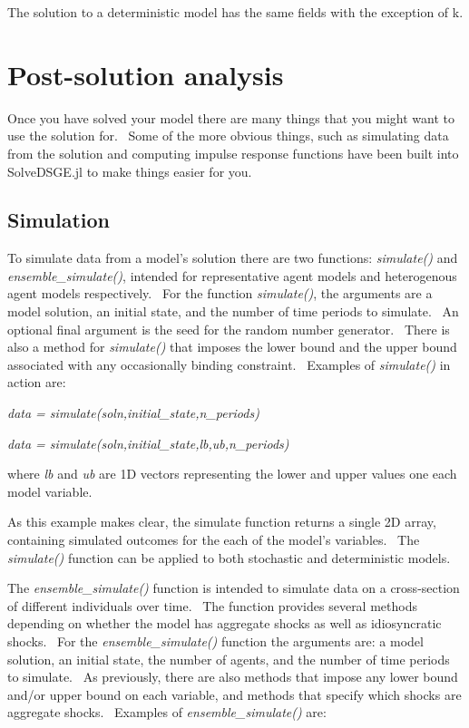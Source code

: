 \documentclass[notitlepage,11pt]{article}
\begin{document}
The solution to a deterministic model has the same fields with the exception
of k.

\section{Post-solution analysis}

Once you have solved your model there are many things that you might want to
use the solution for. \ Some of the more obvious things, such as simulating
data from the solution and computing impulse response functions have been
built into SolveDSGE.jl to make things easier for you.

\subsection{Simulation}

To simulate data from a model's solution there are two functions: \textit{%
simulate()} and \textit{ensemble\_simulate()}, intended for representative
agent models and heterogenous agent models respectively. \ For the function 
\textit{simulate()}, the arguments are a model solution, an initial state,
and the number of time periods to simulate. \ An optional final argument is
the seed for the random number generator. \ There is also a method for 
\textit{simulate()} that imposes the lower bound and the upper bound
associated with any occasionally binding constraint. \ Examples of \textit{%
simulate()} in action are:

\bigskip

\textit{data = simulate(soln,initial\_state,n\_periods)}

\textit{data = simulate(soln,initial\_state,lb,ub,n\_periods)}

\bigskip

where \textit{lb} and \textit{ub} are 1D vectors representing the lower and
upper values one each model variable.

\bigskip

As this example makes clear, the simulate function returns a single 2D
array, containing simulated outcomes for the each of the model's variables.
\ The \textit{simulate()} function can be applied to both stochastic and
deterministic models.

The \textit{ensemble\_simulate()} function is intended to simulate data on a
cross-section of different individuals over time. \ The function provides
several methods depending on whether the model has aggregate shocks as well
as idiosyncratic shocks. \ For the \textit{ensemble\_simulate()} function
the arguments are: a model solution, an initial state, the number of agents,
and the number of time periods to simulate. \ As previously, there are also
methods that impose any lower bound and/or upper bound on each variable, and
methods that specify which shocks are aggregate shocks.   \ Examples of 
\textit{ensemble\_simulate()} are:
\end{document}
